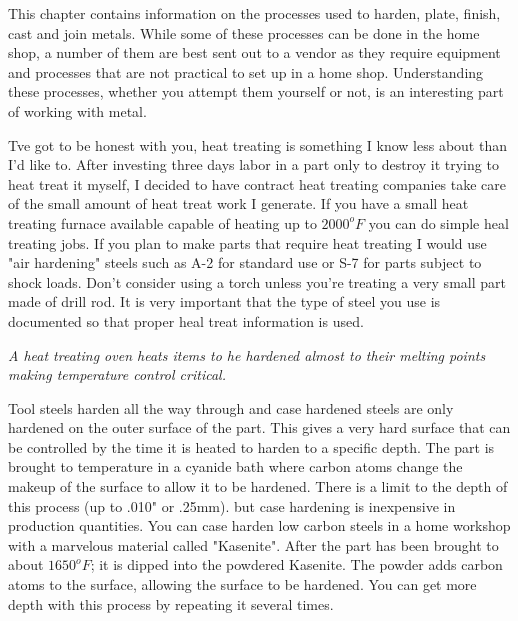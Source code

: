 \secdown

This chapter contains information on the processes used to harden, plate,
finish, cast and join metals. While some of these processes can be done in the
home shop, a number of them are best sent out to a vendor as they require
equipment and processes that are not practical to set up in a home shop.
Understanding these processes, whether you attempt them yourself or not, is an
interesting part of working with metal.

\secdown


Tve got to be honest with you, heat treating is something I know less about than
I'd like to. After investing three days labor in a part only to destroy it
trying to heat treat it myself, I decided to have contract heat treating
companies take care of the small amount of heat treat work I generate. If you
have a small heat treating furnace available capable of heating up to
$2000^{o}F$ you can do simple heal treating jobs. If you plan to make parts that
require heat treating I would use "air hardening" steels such as A-2 for
standard use or S-7 for parts subject to shock loads. Don't consider using a
torch unless you're treating a very small part made of drill rod. It is very
important that the type of steel you use is documented so that proper heal treat
information is used.

\bigskip
\textit{A heat treating oven heats items to he hardened almost to their melting 
points making temperature control critical.}
\bigskip


Tool steels harden all the way through and case hardened steels are only
hardened on the outer surface of the part. This gives a very hard surface that
can be controlled by the time it is heated to harden to a specific depth. The
part is brought to temperature in a cyanide bath where carbon atoms change the
makeup of the surface to allow it to be hardened. There is a limit to the depth
of this process (up to .010" or .25mm). but case hardening is inexpensive in
production quantities. You can case harden low carbon steels in a home workshop
with a marvelous material called "Kasenite". After the part has been brought to
about $1650^{o}F$; it is dipped into the powdered Kasenite. The powder adds
carbon atoms to the surface, allowing the surface to be hardened. You can get
more depth with this process by repeating it several times.

